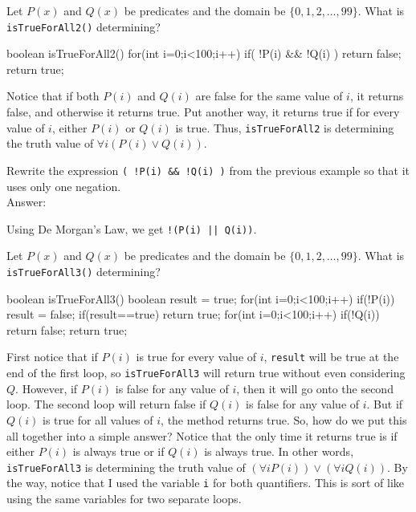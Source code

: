 \begin{exa}
Let $P(x)$ and $Q(x)$ be predicates and the domain be $\{0, 1, 2, \ldots, 99\}$.
What is \verb+isTrueForAll2()+ determining?  
\begin{code}
	    boolean isTrueForAll2() {
	        for(int i=0;i<100;i++) {
	            if( !P(i) && !Q(i) )
	                return false;
	        }
	        return true;
	    }
\end{code}
\begin{sol}
Notice that if both $P(i)$ and $Q(i)$ are false for the same value of $i$, 
it returns false, and otherwise it returns true.  Put another way, it returns
true if for every value of $i$, either $P(i)$ or $Q(i)$ is true. 
Thus, \verb+isTrueForAll2+ is determining the truth value of $\forall i(P(i)\vee Q(i))$.
\end{sol}
\end{exa}

\begin{exer}
Rewrite the expression \verb+( !P(i) && !Q(i) )+ from the previous example so that it uses only one negation.\\
Answer:\\
\vspace*{1in}
\begin{answer}
Using De Morgan's Law, we get \verb+!(P(i) || Q(i))+.
\end{answer}
\end{exer}

\newpage
\begin{exer}
Let $P(x)$ and $Q(x)$ be predicates and the domain be $\{0, 1, 2, \ldots, 99\}$.
What is \verb+isTrueForAll3()+ determining?
\begin{code}
		boolean isTrueForAll3() {
		    boolean result = true;
		    for(int i=0;i<100;i++) {
		        if(!P(i)) {
		            result = false;
		        }
		    }
		    if(result==true) {
		        return true;
		    }
		    for(int i=0;i<100;i++) {
		        if(!Q(i)) {
		            return false;
		        }
		    }
		    return true;
		}
\end{code}
\answerlinethree
\begin{answer}
First notice that if $P(i)$ is true for every value of $i$, \verb+result+ will be true at the
end of the first loop, so  \verb+isTrueForAll3+ will return true without even considering $Q$.
However, if $P(i)$ is false for any value of $i$, then it will go onto the second loop.
The second loop will return false if $Q(i)$ is false for any value of $i$.  But if $Q(i)$ is true
for all values of $i$, the method returns true.
So, how do we put this all together into a simple answer?
Notice that the only time it returns true is if either $P(i)$ is always true or if $Q(i)$ is always true.
In other words,  \verb+isTrueForAll3+ is determining the truth value of $(\forall i P(i)) \vee (\forall i Q(i))$.
By the way, notice that I used the variable \verb+i+ for both quantifiers. This is sort of like using
the same variables for two separate loops.
\end{answer}
\end{exer}

